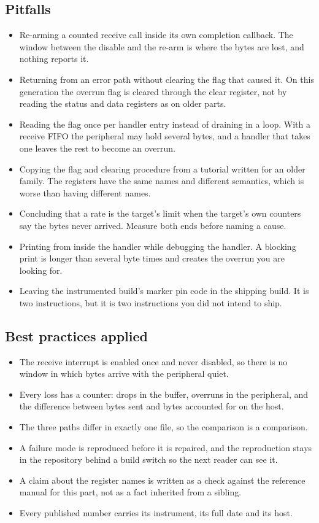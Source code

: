 \subsection*{Pitfalls}

\begin{itemize}
\item Re-arming a counted receive call inside its own completion callback. The
window between the disable and the re-arm is where the bytes are lost, and
nothing reports it.
\item Returning from an error path without clearing the flag that caused it. On
this generation the overrun flag is cleared through the clear register, not by
reading the status and data registers as on older parts.
\item Reading the flag once per handler entry instead of draining in a loop.
With a receive FIFO the peripheral may hold several bytes, and a handler that
takes one leaves the rest to become an overrun.
\item Copying the flag and clearing procedure from a tutorial written for an
older family. The registers have the same names and different semantics, which
is worse than having different names.
\item Concluding that a rate is the target's limit when the target's own
counters say the bytes never arrived. Measure both ends before naming a cause.
\item Printing from inside the handler while debugging the handler. A blocking
print is longer than several byte times and creates the overrun you are looking
for.
\item Leaving the instrumented build's marker pin code in the shipping build.
It is two instructions, but it is two instructions you did not intend to ship.
\end{itemize}

\subsection*{Best practices applied}

\begin{itemize}
\item The receive interrupt is enabled once and never disabled, so there is no
window in which bytes arrive with the peripheral quiet.
\item Every loss has a counter: drops in the buffer, overruns in the peripheral,
and the difference between bytes sent and bytes accounted for on the host.
\item The three paths differ in exactly one file, so the comparison is a
comparison.
\item A failure mode is reproduced before it is repaired, and the reproduction
stays in the repository behind a build switch so the next reader can see it.
\item A claim about the register names is written as a check against the
reference manual for this part, not as a fact inherited from a sibling.
\item Every published number carries its instrument, its full date and its host.
\end{itemize}

